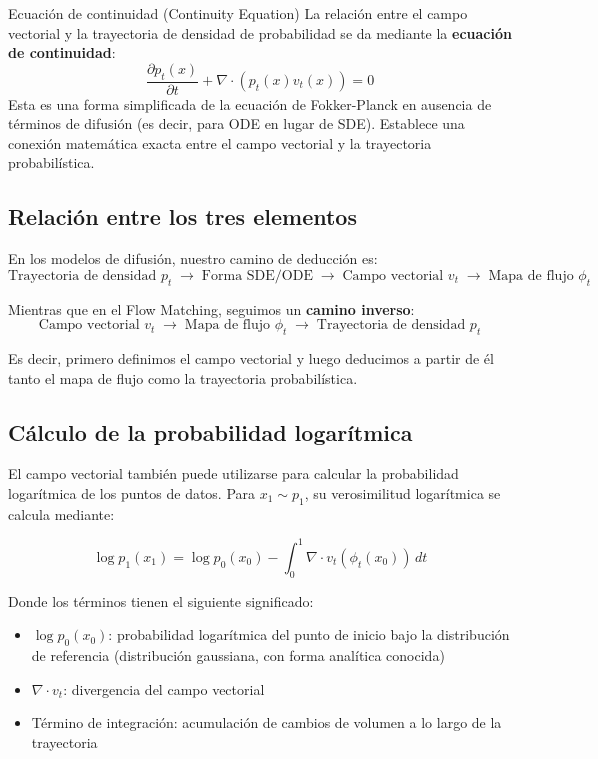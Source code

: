 \begin{knowledgebox}{Ecuación de continuidad (Continuity Equation)}
La relación entre el campo vectorial y la trayectoria de densidad de probabilidad se da mediante la \textbf{ecuación de continuidad}:
$$\frac{\partial p_t(x)}{\partial t} + \nabla \cdot (p_t(x) v_t(x)) = 0$$
Esta es una forma simplificada de la ecuación de Fokker-Planck en ausencia de términos de difusión (es decir, para ODE en lugar de SDE). Establece una conexión matemática exacta entre el campo vectorial y la trayectoria probabilística.
\end{knowledgebox}

\subsection{Relación entre los tres elementos}

En los modelos de difusión, nuestro camino de deducción es:
$$\text{Trayectoria de densidad } p_t \;\longrightarrow\; \text{Forma SDE/ODE} \;\longrightarrow\; \text{Campo vectorial } v_t \;\longrightarrow\; \text{Mapa de flujo } \phi_t$$

Mientras que en el Flow Matching, seguimos un \textbf{camino inverso}:
$$\text{Campo vectorial } v_t \;\longrightarrow\; \text{Mapa de flujo } \phi_t \;\longrightarrow\; \text{Trayectoria de densidad } p_t$$

Es decir, primero definimos el campo vectorial y luego deducimos a partir de él tanto el mapa de flujo como la trayectoria probabilística.

\subsection{Cálculo de la probabilidad logarítmica}

El campo vectorial también puede utilizarse para calcular la probabilidad logarítmica de los puntos de datos. Para $x_1 \sim p_1$, su verosimilitud logarítmica se calcula mediante:

$$\log p_1(x_1) = \log p_0(x_0) - \int_0^1 \nabla \cdot v_t(\phi_t(x_0)) \, dt$$

Donde los términos tienen el siguiente significado:
\begin{itemize}
    \item $\log p_0(x_0)$: probabilidad logarítmica del punto de inicio bajo la distribución de referencia (distribución gaussiana, con forma analítica conocida)
    \item $\nabla \cdot v_t$: divergencia del campo vectorial
    \item Término de integración: acumulación de cambios de volumen a lo largo de la trayectoria
\end{itemize}

